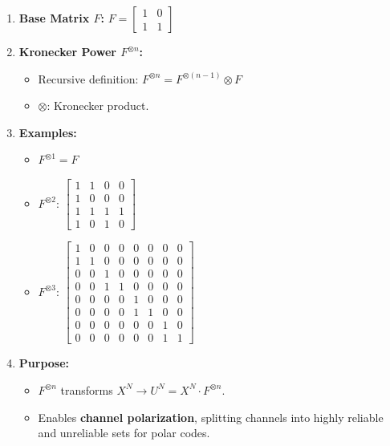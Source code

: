 \documentclass[11pt]{article}
\providecommand{\tightlist}{%
      \setlength{\itemsep}{0pt}\setlength{\parskip}{0pt}}
\begin{document}
\begin{enumerate}
\def\labelenumi{\arabic{enumi}.}
\item
  \textbf{Base Matrix \(F\):}
  \(F = \begin{bmatrix} 1 & 0 \\ 1 & 1 \end{bmatrix}\)
\item
  \textbf{Kronecker Power \(F^{\otimes n}\):}

  \begin{itemize}
  \tightlist
  \item
    Recursive definition:
    \(F^{\otimes n} = F^{\otimes (n-1)} \otimes F\)
  \item
    \(\otimes\): Kronecker product.
  \end{itemize}
\item
  \textbf{Examples:}

  \begin{itemize}
  \tightlist
  \item
    \(F^{\otimes 1} = F\)
  \item
    \(F^{\otimes 2}\):
    \(\begin{bmatrix} 1 & 1 & 0 & 0 \\ 1 & 0 & 0 & 0 \\ 1 & 1 & 1 & 1 \\ 1 & 0 & 1 & 0 \end{bmatrix}\)
  \item
    \(F^{\otimes 3}\):
    \(\begin{bmatrix} 1 & 0 & 0 & 0 & 0 & 0 & 0 & 0 \\ 1 & 1 & 0 & 0 & 0 & 0 & 0 & 0 \\ 0 & 0 & 1 & 0 & 0 & 0 & 0 & 0 \\ 0 & 0 & 1 & 1 & 0 & 0 & 0 & 0 \\ 0 & 0 & 0 & 0 & 1 & 0 & 0 & 0 \\ 0 & 0 & 0 & 0 & 1 & 1 & 0 & 0 \\ 0 & 0 & 0 & 0 & 0 & 0 & 1 & 0 \\ 0 & 0 & 0 & 0 & 0 & 0 & 1 & 1 \end{bmatrix}\)
  \end{itemize}
\item
  \textbf{Purpose:}

  \begin{itemize}
  \tightlist
  \item
    \(F^{\otimes n}\) transforms
    \(X^N \to U^N = X^N \cdot F^{\otimes n}\).
  \item
    Enables \textbf{channel polarization}, splitting channels into
    highly reliable and unreliable sets for polar codes.
  \end{itemize}
\end{enumerate}
\end{document}
